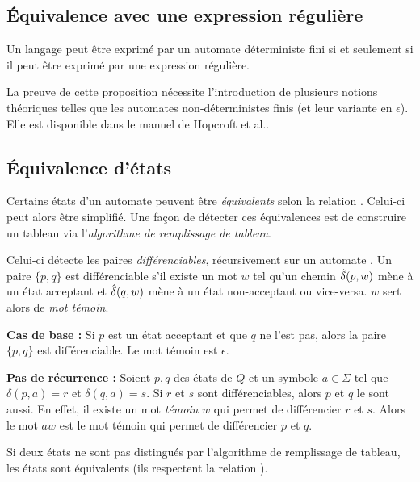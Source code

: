 \subsection{Équivalence avec une expression régulière}\label{ss:regexeq}

\begin{proposition}
	Un langage peut être exprimé par un automate déterministe fini si et seulement si il peut être exprimé par une expression régulière.
\end{proposition}

La preuve de cette proposition nécessite l'introduction de plusieurs notions théoriques telles que les automates non-déterministes finis (et leur variante en $\epsilon$). Elle est disponible dans le manuel de Hopcroft et al.\cite{Hopcroft79}.


\subsection{Équivalence d'états}\label{ss:tfa}
	 
	 Certains états d'un automate peuvent être \emph{équivalents} selon la relation \rm. Celui-ci peut alors être simplifié. Une façon de détecter ces équivalences est de construire un tableau via l'\emph{algorithme de remplissage de tableau}.
	 
	 Celui-ci détecte les paires \emph{différenciables}, récursivement sur un automate \automaton. Un paire $\{p,q\}$ est différenciable s'il existe un mot $w$ tel qu'un chemin $\hat{\delta}(p,w)$ mène à un état acceptant et $\hat{\delta}(q,w)$ mène à un état non-acceptant ou vice-versa. $w$ sert alors de \emph{mot témoin}.
	 
	 
	 \textbf{Cas de base :} Si $p$ est un état acceptant et que $q$ ne l'est pas, alors la paire $\{p,q\}$ est différenciable. Le mot témoin est $\epsilon$.
	 
	 \textbf{Pas de récurrence : } Soient $p,q$ des états de $Q$ et un symbole $a \in \Sigma$ tel que $\delta(p,a)=r$ et $\delta(q,a)=s$. Si $r$ et $s$ sont différenciables, alors $p$ et $q$ le sont aussi. En effet, il existe un mot \emph{témoin} $w$ qui permet de différencier $r$ et $s$. Alors le mot $aw$ est le mot témoin qui permet de différencier $p$ et $q$.
	 
	 \begin{theorem}
	 	Si deux états ne sont pas distingués par l'algorithme de remplissage de tableau, les états sont équivalents (ils respectent la relation \rm).
	 \end{theorem}
	 
